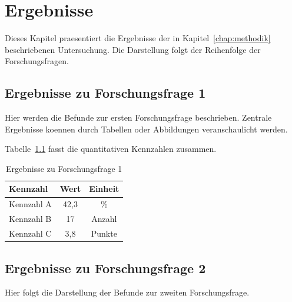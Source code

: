 
\chapter{Ergebnisse}
\label{chap:ergebnisse}

Dieses Kapitel praesentiert die Ergebnisse der in Kapitel~\ref{chap:methodik}
beschriebenen Untersuchung. Die Darstellung folgt der Reihenfolge der
Forschungsfragen.

\section{Ergebnisse zu Forschungsfrage 1}
\label{sec:ergebnis_ff1}

Hier werden die Befunde zur ersten Forschungsfrage beschrieben. Zentrale
Ergebnisse koennen durch Tabellen oder Abbildungen veranschaulicht werden.


Tabelle~\ref{tab:ergebnisse_ff1} fasst die quantitativen Kennzahlen zusammen.

\begin{table}[h]
\centering
\caption{Ergebnisse zu Forschungsfrage 1}
\label{tab:ergebnisse_ff1}
\begin{tabular}{lcc}
\toprule
\textbf{Kennzahl} & \textbf{Wert} & \textbf{Einheit} \\
\midrule
Kennzahl A        & 42{,}3        & \%               \\
Kennzahl B        & 17            & Anzahl           \\
Kennzahl C        & 3{,}8         & Punkte           \\
\bottomrule
\end{tabular}
\end{table}

\section{Ergebnisse zu Forschungsfrage 2}
\label{sec:ergebnis_ff2}

Hier folgt die Darstellung der Befunde zur zweiten Forschungsfrage.

